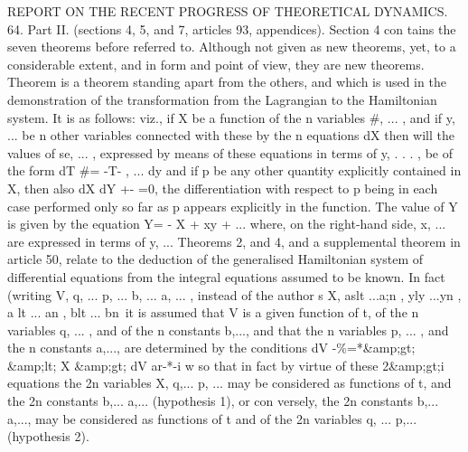 \documentclass[11pt,a4paper]{book}
\begin{document}

REPORT ON THE RECENT PROGRESS
OF THEORETICAL DYNAMICS.
64.
Part
II.
(sections
4,
5,
and
7,
articles
93, appendices).
Section 4 con
tains
the
seven
theorems
before
referred
to.
Although not given
as new theorems,
yet,
to a considerable
extent, and
in form and point
of view, they are new theorems.
Theorem
is
a
theorem
standing
apart
from
the
others,
and
which
is
used
in
the demonstration
of the transformation from
the Lagrangian to
the Hamiltonian system.
It
is
as
follows:
viz.,
if X
be
a
function
of
the
n
variables
\#, ...
,
and
if
y,
...
be
n
other variables connected with these by the n equations
dX
then
will
the
values
of
se,
...
,
expressed
by
means
of
these
equations
in
terms
of
y,
.
.
.
, be
of the form
dT
\#= -T-
, ...
dy
and
if p be any other quantity
explicitly contained
in X, then
also
dX
dY
+-
=0,
the
differentiation
with
respect
to p
being
in
each
case
performed
only
so
far
as p
appears
explicitly
in the
function.
The value
of Y is given by the equation
Y= - X + xy + ...
where, on the right-hand
side,
x, ...
are expressed
in terms of y,
...
Theorems
2,
and
4,
and
a
supplemental
theorem
in
article
50,
relate
to
the
deduction
of
the
generalised
Hamiltonian
system
of
differential
equations
from
the
integral
equations
assumed
to
be
known.
In
fact
(writing
V,
q,
...
p, ...
b, ...
a, ...
,
instead
of
the author s X,
aslt ...a;n , yly ...yn , a lt ... an ,
blt
... bn\
it
is assumed that V
is
a
given
function
of
t,
of
the n
variables
q,
...
, and
of
the n
constants
b,..., and that
the n variables p,
...
, and the n constants
a,..., are determined by the conditions
dV
-\%=*\&amp;gt;
\&amp;lt; X
\&amp;gt;
dV
ar-*-i w
so
that
in
fact
by
virtue
of
these
2\&amp;gt;i
equations
the 2n variables X,
q,... p,
... may
be
considered
as
functions
of
t,
and
the
2n
constants
b,...
a,...
(hypothesis
1),
or
con
versely, the
2n
constants
b,...
a,..., may
be
considered
as
functions
of
t and
of the
2n
variables
q,
... p,...
(hypothesis
2).

\end{document}

